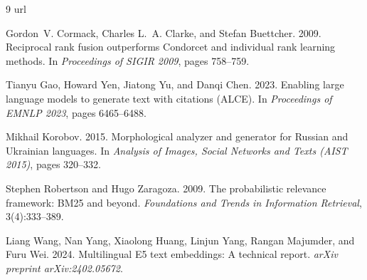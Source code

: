 \documentclass[10pt,a4paper,twocolumn]{article}
\begin{document}
{\small

\begin{thebibliography}{9}
\setlength{\itemsep}{2pt}
\expandafter\ifx\csname url\endcsname\relax\def\url#1{\texttt{#1}}\fi

Gordon~V. Cormack, Charles L.~A. Clarke, and Stefan Buettcher. 2009. Reciprocal rank fusion
outperforms Condorcet and individual rank learning methods. In \emph{Proceedings of SIGIR 2009},
pages 758--759.

Tianyu Gao, Howard Yen, Jiatong Yu, and Danqi Chen. 2023. Enabling large language models to
generate text with citations (ALCE). In \emph{Proceedings of EMNLP 2023}, pages 6465--6488.

Mikhail Korobov. 2015. Morphological analyzer and generator for Russian and Ukrainian languages.
In \emph{Analysis of Images, Social Networks and Texts (AIST 2015)}, pages 320--332.

Stephen Robertson and Hugo Zaragoza. 2009. The probabilistic relevance framework: BM25 and beyond.
\emph{Foundations and Trends in Information Retrieval}, 3(4):333--389.

Liang Wang, Nan Yang, Xiaolong Huang, Linjun Yang, Rangan Majumder, and Furu Wei. 2024.
Multilingual E5 text embeddings: A technical report. \emph{arXiv preprint arXiv:2402.05672}.

\end{thebibliography}
}
\end{document}
